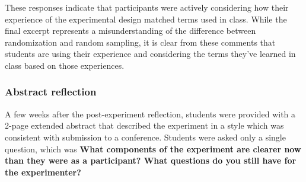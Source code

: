 \documentclass[runningheads
]{llncs}
\begin{document}
These responses indicate that participants were actively considering how
their experience of the experimental design matched terms used in class.
While the final excerpt represents a misunderstanding of the difference
between randomization and random sampling, it is clear from these
comments that students are using their experience and considering the
terms they've learned in class based on those experiences.

\hypertarget{abstract-reflection}{%
\subsubsection{Abstract reflection}\label{abstract-reflection}}

A few weeks after the post-experiment reflection, students were provided
with a 2-page extended abstract that described the experiment in a style
which was consistent with submission to a conference. Students were
asked only a single question, which was \textbf{What components of the
experiment are clearer now than they were as a participant? What
questions do you still have for the experimenter?}
\end{document}
